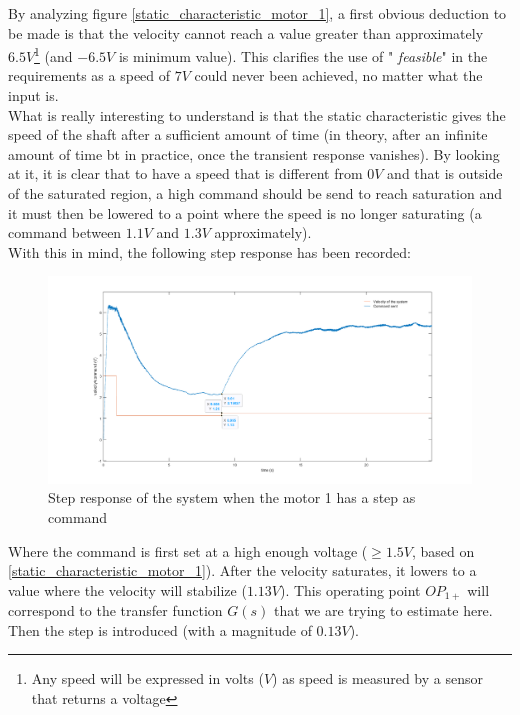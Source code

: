 By analyzing figure \ref{static_characteristic_motor_1}, a first obvious deduction to be made is that the velocity
cannot reach a value greater than approximately $6.5 V$\footnote{Any speed will be expressed in volts ($V$) as speed is
measured by a sensor that returns a voltage} (and $-6.5 V$ is minimum value). This clarifies the use of "\textit{
feasible}" in the requirements as a speed of $7 V$ could never been achieved, no matter what the input is.\\

What is really interesting to understand is that the static characteristic gives the speed of the shaft after a
sufficient amount of time (in theory, after an infinite amount of time bt in practice, once the transient response 
vanishes). By looking at it, it is clear that to have a speed that is different from $0 V$ and that is outside of the
saturated region, a high command should be send to reach saturation and it must then be lowered to a point where the
speed is no longer saturating (a command between $1.1 V$ and $1.3 V$ approximately).\\

With this in mind, the following step response has been recorded:

\begin{figure}[H]
    \centering
    \includegraphics[height=\textheight/3]{Pictures/step_response_positive_motor_1.png}
    \caption{Step response of the system when the motor 1 has a step as command}
    \label{step_response_positive_motor_1}
\end{figure}

Where the command is first set at a high enough voltage ($\geq 1.5 V$, based on \ref{static_characteristic_motor_1}). 
After the velocity saturates, it lowers to a value where the velocity will stabilize ($1.13 V$). This operating point 
\textit{$OP_{1+}$} will correspond to the transfer function $G(s)$ that we are trying to estimate here. Then the step is
introduced (with a magnitude of $0.13 V$).

